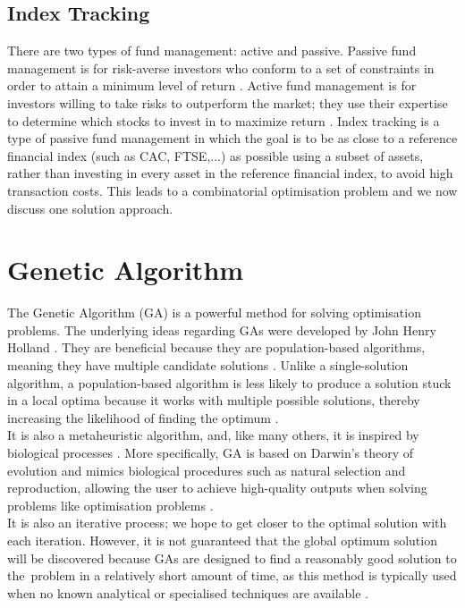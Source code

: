 \documentclass[12pt]{report}
\begin{document}
\subsection{Index Tracking}
There are two types of fund management: active and passive. Passive fund management is for risk-averse investors who conform to a set of constraints in order to attain a minimum level of return \cite{source3}. Active fund management is for investors willing to take risks to outperform the market; they use their expertise to determine which stocks to invest in to maximize return \cite{source3}. Index tracking is a type of passive fund management in which the goal is to be as close to a reference financial index (such as CAC, FTSE,...) as possible \cite{source3} using a subset of assets, rather than investing in every asset in the reference financial index, to avoid high transaction costs. This leads to a combinatorial optimisation problem and we now discuss one solution approach.

\section{Genetic Algorithm}
The Genetic Algorithm (GA) is a powerful method for solving optimisation problems. The underlying ideas regarding GAs were developed by John Henry Holland \cite{beasley1993overview}. They are beneficial because they are population-based algorithms, meaning they have multiple candidate solutions \cite{source1}. Unlike a single-solution algorithm, a population-based algorithm is less likely to produce a solution stuck in a local optima because it works with multiple possible solutions, thereby increasing the likelihood of finding the optimum \cite{source4}. \\ \newline \noindent
It is also a metaheuristic algorithm, and, like many others, it is inspired by biological processes \cite{source1}. More specifically, GA is based on Darwin's theory of evolution and mimics biological procedures such as natural selection and reproduction, allowing the user to achieve high-quality outputs when solving problems like optimisation problems \cite{source4}. \\ \newline \noindent
It is also an iterative process; we hope to get closer to the optimal solution with each iteration. However, it is not guaranteed that the global optimum solution will be discovered because GAs are designed to find a reasonably good solution to the problem in a relatively short amount of time, as this method is typically used when no known analytical or specialised techniques are available \cite{beasley1993overview}.
\end{document}
